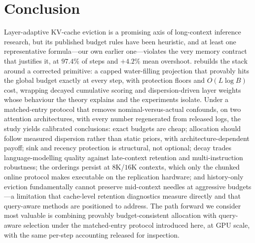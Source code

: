 \section{Conclusion}\label{sec:conclusion}

Layer-adaptive KV-cache eviction is a promising axis of long-context
inference research, but its published budget rules have been heuristic,
and at least one representative formula---our own earlier one---violates
the very memory contract that justifies it, at $97.4\%$ of steps and
$+4.2\%$ mean overshoot. \sage{} rebuilds the stack around a corrected
primitive: a capped water-filling projection that provably hits the
global budget exactly at every step, with protection floors and
$O(L\log B)$ cost, wrapping decayed cumulative scoring and
dispersion-driven layer weights whose behaviour the theory explains and
the experiments isolate. Under a matched-entry protocol that removes
nominal-versus-actual confounds, on two attention architectures, with
every number regenerated from released logs, the study yields calibrated
conclusions: exact budgets are cheap; allocation should follow measured
dispersion rather than static priors, with architecture-dependent payoff;
sink and recency protection is structural, not optional; decay trades
language-modelling quality against late-context retention and
multi-instruction robustness; the orderings persist at $8$K/$16$K
contexts, which only the chunked online protocol makes executable on the
replication hardware; and history-only eviction fundamentally
cannot preserve mid-context needles at aggressive budgets---a limitation
that cache-level retention diagnostics measure directly and that
query-aware methods are positioned to address. The path forward we
consider most valuable is combining provably budget-consistent
allocation with query-aware selection under the matched-entry protocol
introduced here, at GPU scale, with the same per-step accounting released
for inspection.

